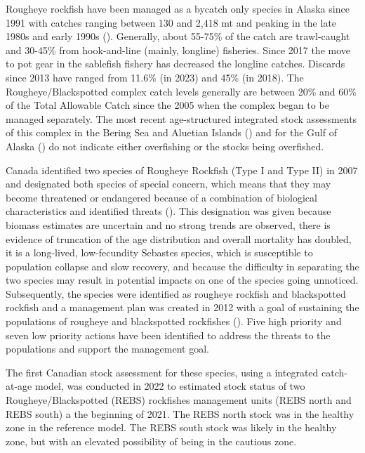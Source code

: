 \documentclass[
]{scrartcl}
\begin{document}
Rougheye rockfish have been managed as a bycatch only species in Alaska
since 1991 with catches ranging between 130 and 2,418 mt and peaking in
the late 1980s and early 1990s
().
Generally, about 55-75\% of the catch are trawl-caught and 30-45\% from
hook-and-line (mainly, longline) fisheries. Since 2017 the move to pot
gear in the sablefish fishery has decreased the longline catches.
Discards since 2013 have ranged from 11.6\% (in 2023) and 45\% (in
2018). The Rougheye/Blackspotted complex catch levels generally are
between 20\% and 60\% of the Total Allowable Catch since the 2005 when
the complex began to be managed separately. The most recent
age-structured integrated stock assessments of this complex in the
Bering Sea and Aluetian Islands
() and for the Gulf of Alaska
() do not
indicate either overfishing or the stocks being overfished.

Canada identified two species of Rougheye Rockfish (Type I and Type II)
in 2007 and designated both species of special concern, which means that
they may become threatened or endangered because of a combination of
biological characteristics and identified threats
(). This designation was given
because biomass estimates are uncertain and no strong trends are
observed, there is evidence of truncation of the age distribution and
overall mortality has doubled, it is a long-lived, low-fecundity
Sebastes species, which is susceptible to population collapse and slow
recovery, and because the difficulty in separating the two species may
result in potential impacts on one of the species going unnoticed.
Subsequently, the species were identified as rougheye rockfish and
blackspotted rockfish and a management plan was created in 2012 with a
goal of sustaining the populations of rougheye and blackspotted
rockfishes
(). Five high priority and seven low priority actions have been
identified to address the threats to the populations and support the
management goal.

The first Canadian stock assessment for these species, using a
integrated catch-at-age model, was conducted in 2022 to estimated stock
status of two Rougheye/Blackspotted (REBS) rockfishes management units
(REBS north and REBS south) a the beginning of 2021. The REBS north
stock was in the healthy zone in the reference model. The REBS south
stock was likely in the healthy zone, but with an elevated possibility
of being in the cautious zone.
\end{document}
